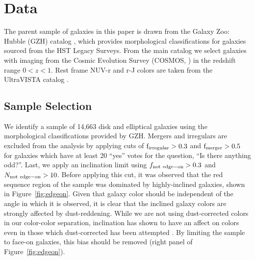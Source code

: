 \documentclass[useAMS,usenatbib]{mn2e}
\begin{document}
\section{Data}
\label{sec:Data}

The parent sample of galaxies in this paper is drawn from the Galaxy Zoo: Hubble (GZH) catalog \citep{Willett2016}, which provides morphological classifications for galaxies sourced from the HST Legacy Surveys. From the main catalog we select galaxies with imaging from the Cosmic Evolution Survey (COSMOS, \citet{Scoville2007}) in the redshift range $0<z<1$.  Rest frame NUV-r and r-J colors are taken from the UltraVISTA catalog \citep{McCracken2012,Ilbert2013}.

\subsection{Sample Selection}
\label{sec:sampleselection}
We identify a sample of 14,663 disk and elliptical galaxies using the morphological classifications provided by GZH. Mergers and irregulars are excluded from the analysis by applying cuts of $\rm f_{irregular} > 0.3$ and $\rm f_{merger} > 0.5$ for galaxies which have at least 20 ``yes'' votes for the question, ``Is there anything odd?''. Last, we apply an inclination limit using $f_{\rm not~edge-on} > 0.3$ and $N_{\rm not~edge-on}>10$. Before applying this cut, it was observed that the red sequence region of the sample was dominated by highly-inclined galaxies, shown in Figure~\ref{fig:edgeon}. Given that galaxy color should be independent of the angle in which it is observed, it is clear that the inclined galaxy colors are strongly affected by dust-reddening. While we are not using dust-corrected colors in our color-color separation, inclination has shown to have an affect on colors even in those which dust-corrected has been attempted \citep{Morselli2016a,Devour2017}. By limiting the sample to face-on galaxies, this bias should be removed (right panel of Figure~\ref{fig:edgeon}). 
 
\end{document}
